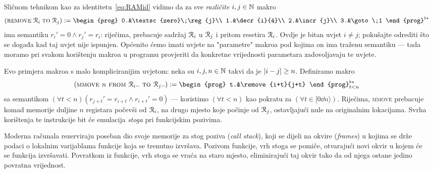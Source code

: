 \noindent
Sličnom tehnikom kao za identitetu~\eqref{eq:RAMid} vidimo da za sve \emph{različite} $i,j\in{\mathbb N}$ makro
\begin{equation}
    (\remove{i}{j}):=\begin{prog}
    0.&\textsc{zero}\;\reg{j}\\
    1.&\decr{i}{4}\\
    2.&\incr{j}\\
    3.&\goto\;1
    \end{prog}^{\flat*}
\end{equation}
ima semantiku $r_i'=0\land r_j'=r_i$: riječima, prebacuje sadržaj $\mathcal R_{i}$ u $\mathcal R_{j}$ i pritom resetira $\mathcal R_{i}$. Ovdje je bitan uvjet $i\ne j$; pokušajte odrediti što se događa kad taj uvjet nije ispunjen. Općenito ćemo imati uvjete na "parametre" makroa pod kojima on ima traženu semantiku --- tada moramo pri svakom korištenju makroa u programu provjeriti da konkretne vrijednosti parametara zadovoljavaju te uvjete.

Evo primjera makroa s malo kompliciranijim uvjetom: neka su $i,j,n\in{\mathbb N}$ takvi da je $\lvert i-j\rvert\ge n$. Definiramo makro
\begin{equation}
    (\textsc{mmove $n$ from $\reg{i}..$ to $\reg{j}..$}):=\begin{prog}
    t.&\remove{i+t}{j+t}
    \end{prog}_{t<n}^{\flat*}
\end{equation}
sa semantikom $(\forall t<n)(r_{j+t}'=r_{i+t}\land r_{i+t}'=0)$ --- koristimo $(\forall t<n)$ kao pokratu za $(\forall t\in[0\dd n\rangle)$. Riječima, \textsc{mmove} prebacuje komad memorije duljine $n$ registara počevši od $\mathcal R_{i}$, na drugo mjesto koje počinje od $\mathcal R_{j}$, ostavljajući nule na originalnim lokacijama. Svrha korištenja te instrukcije bit će emulacija \emph{stoga} pri funkcijskim pozivima.

Moderna računala rezerviraju poseban dio svoje memorije za stog poziva (\emph{call stack}), koji se dijeli na okvire (\emph{frames}) u kojima se drže podaci o lokalnim varijablama funkcije koja se trenutno izvršava. Pozivom funkcije, vrh stoga se pomiče, otvarajući novi okvir u kojem će se funkcija izvršavati. Povratkom iz funkcije, vrh stoga se vraća na staro mjesto, eliminirajući taj okvir tako da od njega ostane jedino povratna vrijednost.

